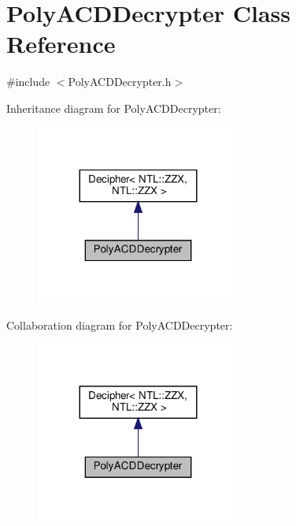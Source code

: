 \hypertarget{classPolyACDDecrypter}{}\section{Poly\+A\+C\+D\+Decrypter Class Reference}
\label{classPolyACDDecrypter}


{\ttfamily \#include $<$Poly\+A\+C\+D\+Decrypter.\+h$>$}



Inheritance diagram for Poly\+A\+C\+D\+Decrypter\+:
\nopagebreak
\begin{figure}[H]
\begin{center}
\leavevmode
\includegraphics[width=191pt]{classPolyACDDecrypter__inherit__graph}
\end{center}
\end{figure}


Collaboration diagram for Poly\+A\+C\+D\+Decrypter\+:
\nopagebreak
\begin{figure}[H]
\begin{center}
\leavevmode
\includegraphics[width=191pt]{classPolyACDDecrypter__coll__graph}
\end{center}
\end{figure}
